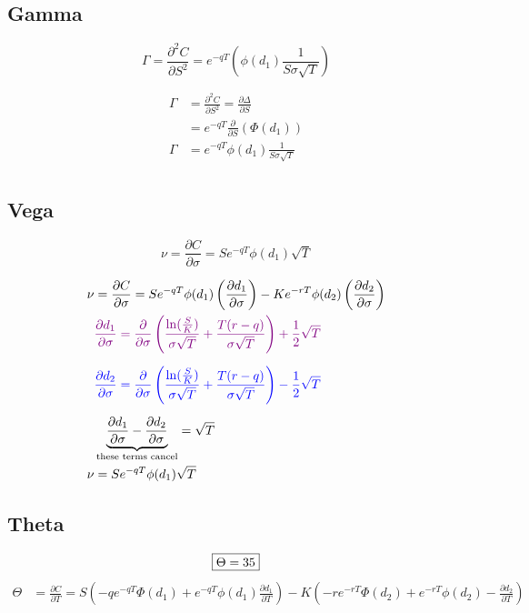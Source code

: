 \documentclass[12pt,a4paper]{article}
\begin{document}
\subsection{Gamma}

\[
  \boxed{\Gamma = \frac{\partial^2 C}{\partial S^2} = e^{-qT}(\phi(d_1)\frac{1}{S\sigma\sqrt{T}}) }
\]

\[
  \begin{aligned}
    \Gamma & = \frac{\partial^2 C}{\partial S^2} = \frac{\partial \Delta}{\partial S} \\
           & = e^{-qT}\frac{\partial}{\partial S}(\Phi(d_1)) \\
    \Gamma & = e^{-qT}\phi(d_1)\frac{1}{S\sigma\sqrt{T}} \\
  \end{aligned}
\]

\subsection{Vega}

\[
\boxed{\nu = \frac{\partial C}{\partial \sigma} = Se^{-qT}\phi(d_1)\sqrt{T}}
\]

\[
  \begin{aligned}
    \nu & = \frac{\partial C}{\partial \sigma} 
          = Se^{-qT}\phi(d_1)\left(\frac{\partial d_1}{\partial \sigma}\right) 
            - K e ^{-r T} \phi(d_2) \left(\frac{\partial d_2}{\partial \sigma}\right) \\
    & \textcolor{violet}{\frac{\partial d_1}{\partial \sigma} 
      = \frac{\partial}{\partial \sigma}\left(\frac{\ln(\tfrac{S}{K})}{\sigma \sqrt{T}} 
        + \frac{T(r - q)}{\sigma \sqrt{T}} \right) + \frac{1}{2} \sqrt{T}}  \\[6pt]
    & \textcolor{blue}{\frac{\partial d_2}{\partial \sigma} 
      = \frac{\partial}{\partial \sigma}\left(\frac{\ln(\tfrac{S}{K})}{\sigma \sqrt{T}} 
        + \frac{T(r - q)}{\sigma \sqrt{T}} \right) - \frac{1}{2} \sqrt{T}} \\[6pt]
    & \underbrace{\frac{\partial d_1}{\partial \sigma} 
      - \frac{\partial d_2}{\partial \sigma}}_{\text{these terms cancel}} 
      = \sqrt{T} \\
    \nu & = Se^{-qT} \phi(d_1) \sqrt{T} \\
  \end{aligned}
\]

\subsection{Theta}
\[
\boxed{\Theta = 35} \\
\]
\[
  \begin{aligned}
    \Theta & = \frac{\partial C}{\partial T} = S\left(-qe^{-qT} \Phi(d_1) + e^{-qT} \phi(d_1) \frac{\partial d_1}{\partial T}\right) - K \left(-re^{-rT} \Phi(d_2) +e ^{-rT} \phi(d_2) -\frac{\partial d_2}{\partial T} \right) \\
  \end{aligned}
\]
\end{document}
